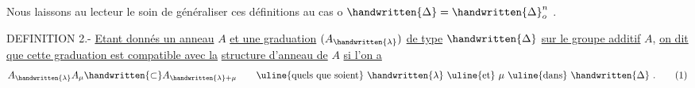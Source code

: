 Nous laissons au lecteur le soin de généraliser ces définitions au cas o
$\handwritten{\Delta}=\handwritten{\Delta}_o^n$ .

DEFINITION 2.- \uline{Etant donnés un anneau} $A$ \uline{et une graduation} $(A_{\handwritten{\lambda}})$ \uline{de type} $\handwritten{\Delta}$
\uline{sur le groupe additif} $A$, \uline{on dit que cette graduation est compatible avec la}
\uline{structure d'anneau de} $A$ \uline{si l'on a}
\begingroup
\makeatletter\tagsleft@true\makeatother
\[
 A_{\handwritten{\lambda}}A_\mu\handwritten{\subset}A_{\handwritten{\lambda}+\mu}\qquad
 \text{\uline{quels que soient} }\handwritten{\lambda}\ \text{\uline{et} }\mu\ \text{\uline{dans} }\handwritten{\Delta}\ .
 \tag*{(1)}
\]
\endgroup
